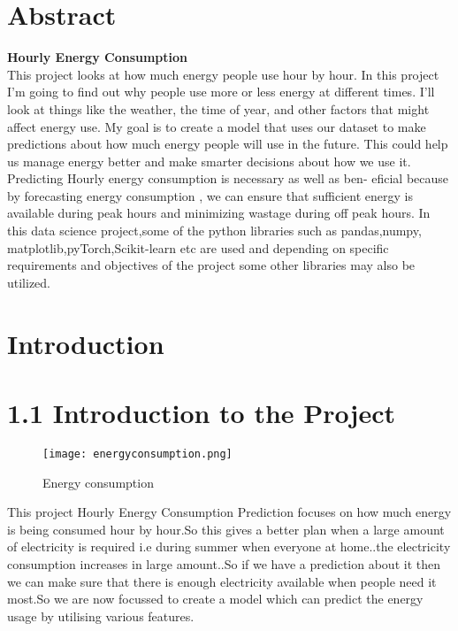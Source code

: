 \documentclass{article}
\begin{document}
\section*{Abstract}
\textbf{Hourly Energy Consumption}
\\
\newline
\color{black!100}
\textmd{
This project looks at how much energy people use hour by hour.
In this project I’m going to find out why people use more or less
energy at different times. I’ll look at things like the weather, the time of year, and other factors that might affect energy use. My goal is to create a model that uses our dataset to make 
predictions about how much energy people will use in the future. This could help us manage energy better and make smarter decisions about how we use it.\\
Predicting Hourly energy consumption is necessary as well as ben-
eficial because by forecasting energy consumption , we can ensure
that sufficient energy is available during peak hours and minimizing wastage during off peak hours.
\newline\newline
In this data science project,some of the python libraries such as
pandas,numpy, matplotlib,pyTorch,Scikit-learn etc are used and depending on specific requirements and objectives of the project some other libraries may also be utilized.
}
\newpage
\section{Introduction}

\section*{1.1 Introduction to the Project}
 \begin{figure}   
\texttt{[image: energyconsumption.png]}
\caption{Energy consumption}
\label{fig:energy consumption }
\end{figure}
This project Hourly Energy Consumption Prediction focuses on how much energy is being consumed hour by hour.So this gives a better plan when a large amount of electricity is required i.e during summer when everyone at home..the electricity consumption increases in large amount..So if we have a prediction about it then we can make sure that there is enough electricity available when people need it most.So we are now focussed to create a model which can predict the energy usage by utilising various features.
\\
\end{document}
